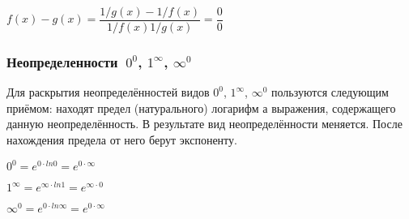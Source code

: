 $ f(x)-g(x) = \dfrac{1/g(x) - 1/f(x)}{1/f(x)1/g(x)} = \dfrac{0}{0} $

\subsubsection{Неопределенности $~0^0$, $1^\infty$, $\infty^0$}


Для раскрытия неопределённостей видов $0^0$, $1^\infty$, $\infty^0$ пользуются следующим приёмом: находят предел (натурального) логарифм а выражения, содержащего данную неопределённость. В результате вид неопределённости меняется. После нахождения предела от него берут экспоненту.

$0^0=e^{0\cdot ln{0}}=e^{0\cdot\infty}$

$1^\infty=e^{\infty\cdot ln{1}}=e^{\infty\cdot 0}$

$\infty^0=e^{0\cdot ln{\infty}}=e^{0\cdot\infty}$
